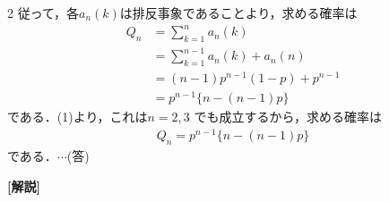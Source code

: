 \documentclass[../../main.tex]{subfiles}
\begin{document}
\begin{multicols}{2}
  従って，各$a_{n}(k)$は排反事象であることより，求める確率は
  \begin{align}
    Q_n
    & = \sum_{k=1}^{n} a_n(k)            \\
    & = \sum_{k=1}^{n-1} a_n(k) + a_n(n) \\
    & = (n-1) p^{n-1} (1-p) + p^{n-1}     \\
    & = p^{n-1} \{ n - (n-1)p \}
  \end{align}
  である．(1)より，これは$n=2,3$ でも成立するから，求める確率は
  \begin{align}
    Q_n = p^{n-1} \{ n - (n-1)p \}
  \end{align}
  である．$\cdots$(答)

  {\bf [解説]}


  \newpage

\end{multicols}
\end{document}
